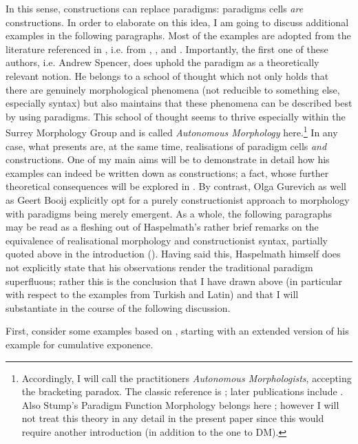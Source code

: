 \documentclass[output=paper]{langsci/langscibook}
\begin{document}
In this sense, constructions can replace paradigms: paradigms cells \textit{are} constructions. In order to elaborate on this idea, I am going to discuss additional examples in the following paragraphs. Most of the examples are adopted from the literature referenced in \citet[58--59]{Haspelmath2011}, i.e. from \citet{Spencer2001}, \citet{Gurevich2006}, and \citet{Booij2010}. Importantly, the first one of these authors, i.e. Andrew Spencer, does uphold the paradigm as a theoretically relevant notion. He belongs to a school of thought which not only holds that there are genuinely morphological phenomena (not reducible to something else, especially syntax) but also maintains that these phenomena can be described best by using paradigms. This school of thought seems to thrive especially within the Surrey Morphology Group and is called \textit{Autonomous Morphology} here.\footnote{Accordingly, I will call the practitioners \textit{Autonomous Morphologists}, accepting the bracketing paradox. The classic reference is \citet{Aronoff1994}; later publications include \citet{MaidenEtAl2011}. Also Stump’s Paradigm Function Morphology belongs here \citep{Stump2016}; however I will not treat this theory in any detail in the present paper since this would require another introduction (in addition to the one to DM).} In any case, what \citet{Spencer2001} presents are, at the same time, realisations of paradigm cells \textit{and} constructions. One of my main aims will be to demonstrate in detail how his examples can indeed be written down as constructions; a fact, whose further theoretical consequences will be explored in . By contrast, Olga Gurevich as well as Geert Booij explicitly opt for a purely constructionist approach to morphology with paradigms being merely emergent. As a whole, the following paragraphs may be read as a fleshing out of Haspelmath’s rather brief remarks on the equivalence of realisational morphology and constructionist syntax, partially quoted above in the introduction (). Having said this, Haspelmath himself does not explicitly state that his observations render the traditional paradigm superfluous; rather this is the conclusion that I have drawn above (in particular with respect to the examples from Turkish and Latin) and that I will substantiate in the course of the following discussion.

First, consider some examples based on \citet{Spencer2001}, starting with an extended version of his example for cumulative exponence.
\end{document}

